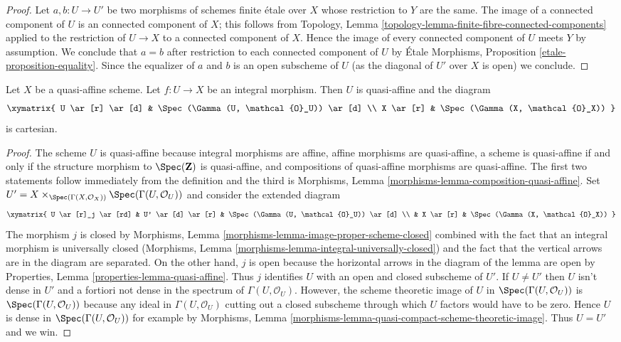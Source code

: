 \begin{proof}
Let $a, b : U \to U'$ be two morphisms of schemes finite \'etale over $X$
whose restriction to $Y$ are the same. The image of a connected component
of $U$ is an connected component of $X$; this follows from
Topology, Lemma \ref{topology-lemma-finite-fibre-connected-components}
applied to the restriction of $U \to X$ to a connected component of $X$.
Hence the image of every connected component of $U$ meets $Y$
by assumption. We conclude that $a = b$ after restriction to each
connected component of $U$ by \'Etale Morphisms, Proposition
\ref{etale-proposition-equality}. Since the equalizer of $a$ and $b$
is an open subscheme of $U$ (as the diagonal of $U'$ over $X$ is open)
we conclude.
\end{proof}

\begin{lemma}
\label{lemma-integral-over-quasi-affine}
Let $X$ be a quasi-affine scheme. Let $f : U \to X$ be an integral
morphism. Then $U$ is quasi-affine and the diagram
$$
\xymatrix{
U \ar[r] \ar[d] & \Spec(\Gamma(U, \mathcal{O}_U)) \ar[d] \\
X \ar[r] & \Spec(\Gamma(X, \mathcal{O}_X))
}
$$
is cartesian.
\end{lemma}

\begin{proof}
The scheme $U$ is quasi-affine because integral morphisms are affine,
affine morphisms are quasi-affine, a scheme is quasi-affine if and only if
the structure morphism to $\Spec(\mathbf{Z})$ is quasi-affine, and
compositions of quasi-affine morphisms are quasi-affine.
The first two statements follow immediately from the definition
and the third is
Morphisms, Lemma \ref{morphisms-lemma-composition-quasi-affine}.
Set $U' =
X \times_{\Spec(\Gamma(X, \mathcal{O}_X))} \Spec(\Gamma(U, \mathcal{O}_U))$
and consider the extended diagram
$$
\xymatrix{
U \ar[r]_j \ar[rd] & U' \ar[d] \ar[r] &
\Spec(\Gamma(U, \mathcal{O}_U)) \ar[d] \\
& X \ar[r] & \Spec(\Gamma(X, \mathcal{O}_X))
}
$$
The morphism $j$ is closed by
Morphisms, Lemma \ref{morphisms-lemma-image-proper-scheme-closed}
combined with the fact that an integral morphism is universally closed
(Morphisms, Lemma \ref{morphisms-lemma-integral-universally-closed})
and the fact that the vertical arrows are in the diagram are separated.
On the other hand, $j$ is open because the horizontal
arrows in the diagram of the lemma are open by
Properties, Lemma \ref{properties-lemma-quasi-affine}.
Thus $j$ identifies $U$ with an open and closed subscheme of $U'$.
If $U \not = U'$ then $U$ isn't dense in $U'$ and a fortiori
not dense in the spectrum of $\Gamma(U, \mathcal{O}_U)$.
However, the scheme theoretic image of
$U$ in $\Spec(\Gamma(U, \mathcal{O}_U))$ is $\Spec(\Gamma(U, \mathcal{O}_U))$
because any ideal in $\Gamma(U, \mathcal{O}_U)$
cutting out a closed subscheme through which $U$
factors would have to be zero.
Hence $U$ is dense in $\Spec(\Gamma(U, \mathcal{O}_U))$ for example by
Morphisms, Lemma \ref{morphisms-lemma-quasi-compact-scheme-theoretic-image}.
Thus $U = U'$ and we win.
\end{proof}

